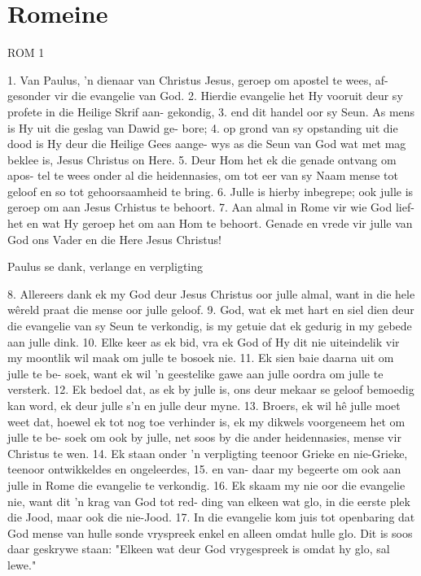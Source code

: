 \chapter{Romeine}
\renewcommand{\chaplabel}{Romeine}


ROM 1

1.  Van Paulus, 'n dienaar van Christus 
Jesus, geroep om apostel te wees, af-
gesonder vir die evangelie van God.
2.  Hierdie evangelie het Hy vooruit 
deur sy profete in die Heilige Skrif aan-
gekondig, 3.  end dit handel oor sy Seun.  As
mens is Hy uit die geslag van Dawid ge-
bore;  4.  op grond van sy opstanding uit die 
dood is Hy deur die Heilige Gees aange-
wys as die Seun van God wat met mag beklee is,
Jesus Christus on Here.  5.  Deur 
Hom het ek die genade ontvang om apos-
tel te wees onder al die heidennasies, om
tot eer van sy Naam mense tot geloof en
so tot gehoorsaamheid te bring.  6.  Julle is
hierby inbegrepe;  ook julle is geroep om 
aan Jesus Crhistus te behoort.
7.  Aan almal in Rome vir wie God lief-
het en wat Hy geroep het om aan Hom te 
behoort.
Genade en vrede vir julle van God ons 
Vader en die Here Jesus Christus!

Paulus se dank, verlange en verpligting

8.  Allereers dank ek my God deur Jesus
Christus oor julle almal, want in die hele
wêreld praat die mense oor julle geloof.
9.  God, wat ek met hart en siel dien deur
die evangelie van sy Seun te verkondig,
is my getuie dat ek gedurig in my gebede
aan julle dink.  10.  Elke keer as ek bid, vra
ek God of Hy dit nie uiteindelik vir my 
moontlik wil maak om julle te bosoek nie.
11.  Ek sien baie daarna uit om julle te be-
soek, want ek wil 'n geestelike gawe aan 
julle oordra om julle te versterk.  12.  Ek
bedoel dat, as ek by julle is, ons deur
mekaar se geloof bemoedig kan word, ek
deur julle s'n en julle deur myne.
13.  Broers, ek wil hê julle moet weet dat,
hoewel ek tot nog toe verhinder is, ek my 
dikwels voorgeneem het om julle te be-
soek om ook by julle, net soos by die 
ander heidennasies, mense vir Christus
te wen.  14.  Ek staan onder 'n verpligting
teenoor Grieke en nie-Grieke, teenoor
ontwikkeldes en ongeleerdes, 15.  en van-
daar my begeerte om ook aan julle in 
Rome die evangelie te verkondig.
16.  Ek skaam my nie oor die evangelie
nie, want dit 'n krag van God tot red-
ding van elkeen wat glo, in die eerste plek
die Jood, maar ook die nie-Jood.  17.  In die 
evangelie kom juis tot openbaring dat
God mense van hulle sonde vryspreek
enkel en alleen omdat hulle glo.  Dit is
soos daar geskrywe staan:  "Elkeen wat
deur God vrygespreek is omdat hy glo, 
sal lewe."

